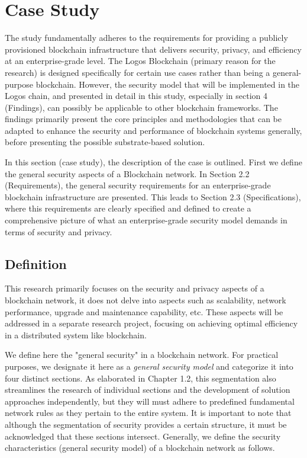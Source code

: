 \section{Case Study}
The study fundamentally adheres to the requirements for providing a publicly provisioned blockchain infrastructure that delivers security, privacy, and efficiency at an enterprise-grade level. The Logos Blockchain (primary reason for the research) is designed specifically for certain use cases rather than being a general-purpose blockchain. However, the security model that will be implemented in the Logos chain, and presented in detail in this study, especially in section 4 (Findings), can possibly be applicable to other blockchain frameworks. The findings primarily present the core principles and methodologies that can be adapted to enhance the security and performance of blockchain systems generally, before presenting the possible substrate-based solution.

In this section (case study), the description of the case is outlined. First we define the general security aspects of a Blockchain network. In Section 2.2 (Requirements), the general security requirements for an enterprise-grade blockchain infrastructure are presented. This leads to Section 2.3 (Specifications), where this requirements are clearly specified and defined to create a comprehensive picture of what an enterprise-grade security model demands in terms of security and privacy.

\subsection{Definition}
This research primarily focuses on the security and privacy aspects of a blockchain network\cite{block_secure_blog}, it does not delve into aspects such as scalability, network performance, upgrade and maintenance capability, etc. These aspects will be addressed in a separate research project, focusing on achieving optimal efficiency in a distributed system like blockchain.

We define here the "general security" in a blockchain network. For practical purposes, we designate it here as a \textit{general security model} and categorize it into four distinct sections. As elaborated in Chapter 1.2, this segmentation also streamlines the research of individual sections and the development of solution approaches independently, but they will must adhere to predefined fundamental network rules as they pertain to the entire system. It is important to note that although the segmentation of security provides a certain structure, it must be acknowledged that these sections intersect.
Generally, we define the security characteristics (general security model) of a blockchain network as follows.

